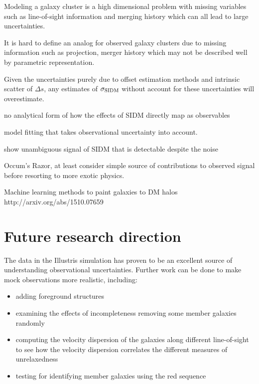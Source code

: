 Modeling a galaxy cluster is a high dimensional problem with missing
variables such as line-of-sight information and merging history which can all 
lead to large uncertainties.

It is hard to define an analog for observed galaxy clusters due to missing
information such as projection, merger history which may not be described well
by parametric representation.

Given the uncertainties purely due to offset estimation methods and 
intrinsic scatter of $\Delta s$, any estimates of $\sigma_{\rm SIDM}$ without
account for these uncertainties will overestimate. 

  


no analytical form of how the effects of SIDM directly map as observables  
 
model fitting that takes  observational uncertainty into account. 

show unambiguous signal of SIDM that is detectable despite the noise 

Occum's Razor, at least consider simple source of contributions to observed signal 
before resorting to more exotic physics.

Machine learning methods to paint galaxies to DM halos 
http://arxiv.org/abs/1510.07659


\section{Future research direction}
The data in the Illustris simulation has proven to be an excellent source of
understanding observational uncertainties.
Further work can be done to make mock observations more realistic, including:
\begin{itemize}
		\item adding foreground structures 
		\item examining the effects of incompleteness removing some member galaxies randomly 
		\item computing the velocity dispersion of the galaxies along different
			line-of-sight to see how the velocity dispersion correlates the different
			measures of unrelaxedness
		\item testing for identifying member galaxies using the red sequence
	\end{itemize}


